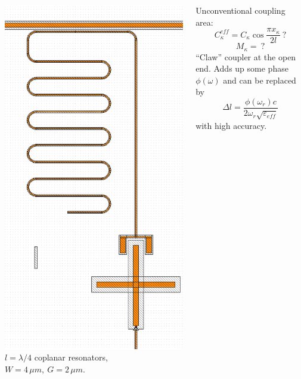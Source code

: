 \documentclass[aspectratio=169, 13pt]{beamer}
\begin{document}
\begin{frame}[c]\frametitle{\secname}\framesubtitle{\subsecname}
\begin{columns}[c]
\includegraphics[height=0.9\textheight]{xmonres}
$l = \lambda/4$ coplanar resonators, $W=4\,\mu m,\ G=2\,\mu m$.

\vspace{0.5cm}
Unconventional coupling area:
 $$C_\kappa^{eff} = C_\kappa \cos \frac{\pi x_\kappa}{2 l}\ ?$$
 $$M_\kappa =\ ?$$
``Claw'' coupler at the open end. Adds up some phase $\phi(\omega)$ and can be replaced by
$$\Delta l = \frac{\phi(\omega_r) c}{2 \omega_r \sqrt{\varepsilon_{eff}}}$$
with high accuracy.
\end{columns}
\end{frame}
\end{document}

